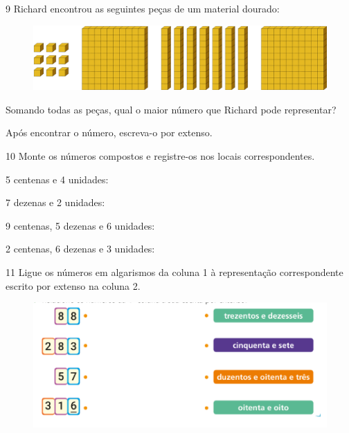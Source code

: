 \num{9} Richard encontrou as seguintes peças de um material dourado:

\begin{figure}[htpb!]
\includegraphics[width=\textwidth]{./media/image4.png}
\end{figure}

\item Somando todas as peças, qual o maior número que Richard pode representar? 

\item Após encontrar o número, escreva-o por extenso.

\num{10} Monte os números compostos e registre-os nos locais correspondentes.

\begin{escolha}
\item 5 centenas e 4 unidades:
\reduline{504\hfill}

\item 7 dezenas e 2 unidades:
\reduline{72\hfill}

\item 9 centenas, 5 dezenas e 6 unidades:
\reduline{956\hfill}

\item 2 centenas, 6 dezenas e 3 unidades:
\reduline{263\hfill}

\end{escolha}

\num{11} Ligue os números em algarismos da coluna 1 
à representação correspondente escrito por extenso na coluna 2.

\begin{figure}[htpb!]
\centering
\includegraphics[width=\textwidth]{./media/image5.png}
\end{figure}

